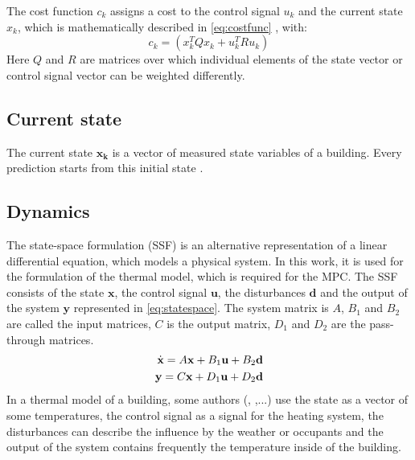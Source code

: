     The cost function $c_k$ assigns a cost to the control signal $u_k$ and the current state $x_k$, which is mathematically described in
    \autoref{eq:costfunc}
    , with:
    \begin{equation}
    \label{eq:c_k}
    c_k = (x_k^TQx_k+u_k^TRu_k)
    \end{equation}
    Here $Q$ and $R$ are matrices over which individual elements of the state vector or control signal vector can be weighted differently.  
    \cite{Kouvaritakis.2016}

\subsection{Current state}
\label{subsection:currentstate}

    The current state $\mathbf{x_k}$ is a vector of measured state variables of a building. Every prediction starts from this initial state \cite{Oldewurtel.2012}.
    
\subsection{Dynamics}
\label{subsection:dynamics}
    
    The state-space formulation (SSF) is an alternative representation of a linear differential equation, which models a physical system. In this work, it is used for the formulation of the thermal model, which is required for the MPC. The SSF consists of the state $\textbf{x}$, the control signal $\textbf{u}$, the disturbances $\textbf{d}$ and the output of the system $\textbf{y}$ represented in \autoref{eq:statespace}. The system matrix is $A$, $B_1$ and $B_2$ are called the input matrices, $C$ is the output matrix, $D_1$ and $D_2$ are the pass-through matrices.  
    \begin{align}
    \label{eq:statespace}
    \dot{\textbf{x}}=A\textbf{x}+B_1\textbf{u}+B_2\textbf{d}\\
    \textbf{y}=C\textbf{x}+D_1\textbf{u}+D_2\textbf{d} \notag
    \end{align}
    In a thermal model of a building, some authors (\cite{Hazyuk.2012}, \cite{Siroky.2011},...) use the state as a vector of some temperatures, the control signal as a signal for the heating system, the disturbances can describe the influence by the weather or occupants and the output of the system contains frequently the temperature inside of the building.
    


